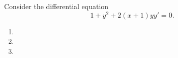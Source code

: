 Consider the differential equation $$1 + y^2 + 2(x+1)yy' = 0.$$
\begin{enumerate}
    \item  \vspace{.5cm}
    \item  \vspace{.5cm}
    \item 
  \end{enumerate}